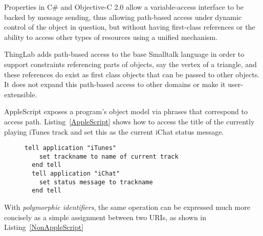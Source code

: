 \documentclass[preprint,authoryear]{acm_proc_article-sp}
\begin{document}
Properties in C\# and Objective-C 2.0 allow a variable-access interface to be backed by 
message sending, thus allowing path-based access under dynamic control of the object
in question, but without having first-class references or the ability to access other
types of resources using a unified mechanism.

ThingLab\cite{thinglab}  adds path-based access to the base Smalltalk language in order to support
constraints referencing parts of objects, say the vertex of a triangle, and these
references do exist as first class objects that can be passed to other objects.
   It does not
expand this path-based access to other domains or make it user-extensible.

AppleScript\cite{applescript-hopl3} exposes a program's object model via
phrases that correspond to access path.  Listing~\ref{AppleScript} shows 
how to access the title of the currently playing iTunes track and set this
as the current iChat status message.


\begin{figure}[htbp]
\begin{lstlisting}[style=L,label= AppleScript,caption=Using AppleScript to set chat status from track name.]
  tell application "iTunes"
    set trackname to name of current track
  end tell
  tell application "iChat"
    set status message to trackname
  end tell
\end{lstlisting}
\end{figure}

With \emph{polymorphic identifiers}, the same operation can be expressed
much more concisely as a simple assignment between two URIs,
as shown in Listing~\ref{NonAppleScript}

\end{document}
